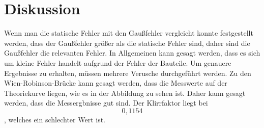 \section{Diskussion}
Wenn man die statische Fehler mit den Gaußfehler vergleicht konnte festgestellt werden, dass der Gaußfehler größer
als die statische Fehler sind, daher sind die Gaußfehler die relevanten Fehler.
In Allgemeinen kann gesagt werden, dass es sich um kleine Fehler handelt aufgrund der Fehler der 
Bauteile. Um genauere Ergebnisse zu erhalten, müssen mehrere Verusche durchgeführt werden.
Zu den Wien-Robinson-Brücke kann gesagt werden, dass die Messwerte auf der Theoriekurve liegen, wie es in der Abbildung zu sehen ist.
Daher kann gesagt werden, dass die Messergbnisse gut sind.
Der Klirrfaktor liegt bei $$0,1154$$, welches ein schlechter Wert ist.



\label{sec:Diskussion}
